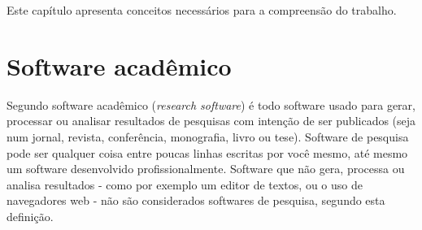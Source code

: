 

{Este capítulo apresenta conceitos necessários para a compreensão do trabalho.}
\label{fundamentacao}

\section{Software acadêmico}



Segundo  software acadêmico ({\it research
software}) é todo software usado para gerar, processar ou analisar resultados
de pesquisas com intenção de ser publicados (seja num jornal, revista,
conferência, monografia, livro ou tese). Software de pesquisa pode ser qualquer
coisa entre poucas linhas escritas por você mesmo, até mesmo um software
desenvolvido profissionalmente. Software que não gera, processa ou analisa
resultados - como por exemplo um editor de textos, ou o uso de navegadores web
- não são considerados softwares de pesquisa, segundo esta definição.


